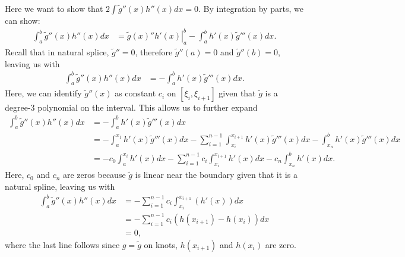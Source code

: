 	Here we want to show that $2\int \widetilde{g}''(x) h''(x)dx = 0$. By integration by parts, we can show: 
	\begin{align*}
		\int_{a}^{b} \widetilde{g}''(x) h''(x)dx &= \left.\widetilde{g}(x)''h'(x) \right|_{a}^b - \int_{a}^{b} h'(x)\widetilde{g}'''(x)dx.
	\end{align*}
	Recall that in natural splice, $\widetilde{g}'' = 0$, therefore $\widetilde{g}''(a) = 0$ and $\widetilde{g}''(b) = 0$, leaving us with
	\begin{align*}
		\int_{a}^{b} \widetilde{g}''(x) h''(x)dx &= - \int_{a}^{b} h'(x)\widetilde{g}'''(x)dx.
	\end{align*}
	Here, we can identify $\widetilde{g}''(x)$ as constant $c_i$ on $[\xi_i, \xi_{i+1}]$ given that $\widetilde{g}$ is a degree-$3$ polynomial on the interval. This allows us to further expand 
	\begin{align*}
		\int_{a}^{b} \widetilde{g}''(x) h''(x)dx &= - \int_{a}^{b} h'(x)\widetilde{g}'''(x)dx \\
		&= - \int_{a}^{x_1} h'(x)\widetilde{g}'''(x)dx  - \sum_{i = 1}^{n-1}\int_{x_i}^{x_{i+1}} h'(x)\widetilde{g}'''(x)dx - \int_{x_n}^{b} h'(x)\widetilde{g}'''(x)dx \\ 
		&= -c_0 \int_{a}^{x_i} h'(x)dx  - \sum_{i = 1}^{n-1} c_i\int_{x_i}^{x_{i+1}} h'(x)dx - c_{n} \int_{x_n}^{b} h'(x)dx.
	\end{align*}
	Here, $c_0$ and $c_n$ are zeros because $\widetilde{g}$ is linear near the boundary given that it is a natural spline, leaving us with
	\begin{align*}
		\int_{a}^{b} \widetilde{g}''(x) h''(x)dx &=  - \sum_{i = 1}^{n-1} c_i\int_{x_i}^{x_{i+1}} (h'(x))dx \\ 
		&=   - \sum_{i = 1}^{n-1} c_i (h(x_{i+1}) - h(x_i))dx  \\
		& = 0,
	\end{align*}
	where the last line follows since $g = \widetilde{g}$ on knots, $h(x_{i+1})$ and $h(x_{i})$ are zero. 


